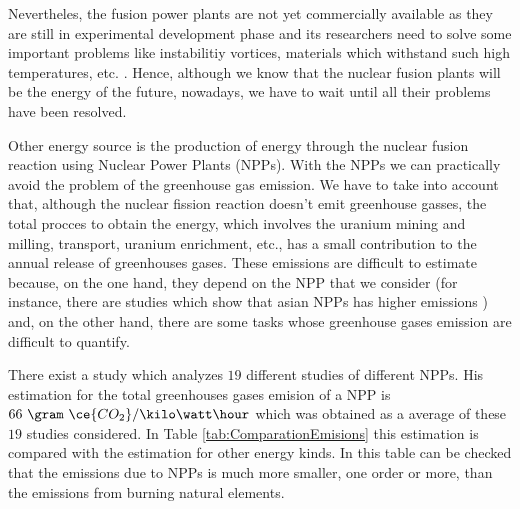 Nevertheles, the fusion power plants are not yet commercially available as they are still in experimental development phase and its researchers need to solve some important problems like instabilitiy vortices, materials which withstand such high temperatures, etc. \cite{FusionCourse}. Hence, although we know that the nuclear fusion plants will be the energy of the future, nowadays, we have to wait until all their problems have been resolved.

Other energy source is the production of energy through the nuclear fusion reaction using Nuclear Power Plants (NPPs). With the NPPs we can practically avoid the problem of the greenhouse gas emission. We have to take into account that, although the nuclear fission reaction doesn't emit greenhouse gasses, the total procces to obtain the energy, which involves the uranium mining and milling, transport, uranium enrichment, etc., has a small contribution to the annual release of greenhouses gases. These emissions are difficult to estimate because, on the one hand, they depend on the NPP that we consider (for instance, there are studies which show that asian NPPs has higher emissions \cite{ComparationEmissions}) and, on the other hand, there are some tasks whose greenhouse gases emission are difficult to quantify\cite{ComparationEmissions}. 

There exist a study \cite{ComparationEmissions} which analyzes $19$ different studies of different NPPs. His estimation for the total greenhouses gases emision of a NPP is $66~\gram~\ce{CO_2} /\kilo\watt\hour$ which was obtained as a average of these $19$ studies considered. In Table \ref{tab:ComparationEmisions} this estimation is compared with the estimation for other energy kinds. In this table can be checked that the emissions due to NPPs is much more smaller, one order or more, than the emissions from burning natural elements.

